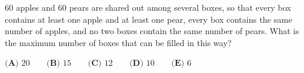 $60$ apples and $60$ pears are shared out among several boxes, so that every box contains at least one apple and at least one pear, every box contains the same number of apples, and no two boxes contain the same number of pears. What is the maximum number of boxes that can be filled in this way?

$\textbf{(A) }20\qquad\textbf{(B) }15\qquad\textbf{(C) }12\qquad\textbf{(D) }10\qquad\textbf{(E) }6$
